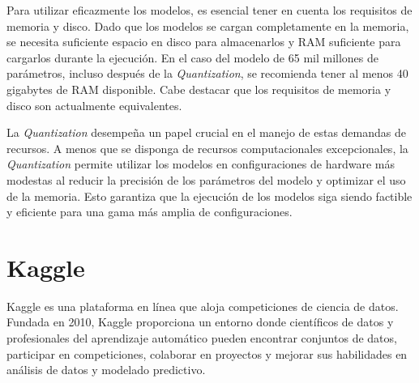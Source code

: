 Para utilizar eficazmente los modelos, es esencial tener en cuenta los requisitos de memoria y disco. Dado que los modelos se cargan completamente en la memoria, se necesita suficiente espacio en disco para almacenarlos y RAM suficiente para cargarlos durante la ejecución. En el caso del modelo de 65 mil millones de parámetros, incluso después de la \textit{Quantization}, se recomienda tener al menos 40 gigabytes de RAM disponible. Cabe destacar que los requisitos de memoria y disco son actualmente equivalentes.


La \textit{Quantization} desempeña un papel crucial en el manejo de estas demandas de recursos. A menos que se disponga de recursos computacionales excepcionales, la \textit{Quantization} permite utilizar los modelos en configuraciones de hardware más modestas al reducir la precisión de los parámetros del modelo y optimizar el uso de la memoria. Esto garantiza que la ejecución de los modelos siga siendo factible y eficiente para una gama más amplia de configuraciones.

\section{Kaggle}

Kaggle es una plataforma en línea que aloja competiciones de ciencia de datos. Fundada en 2010, Kaggle proporciona un entorno donde científicos de datos y profesionales del aprendizaje automático pueden encontrar conjuntos de datos, participar en competiciones, colaborar en proyectos y mejorar sus habilidades en análisis de datos y modelado predictivo.

